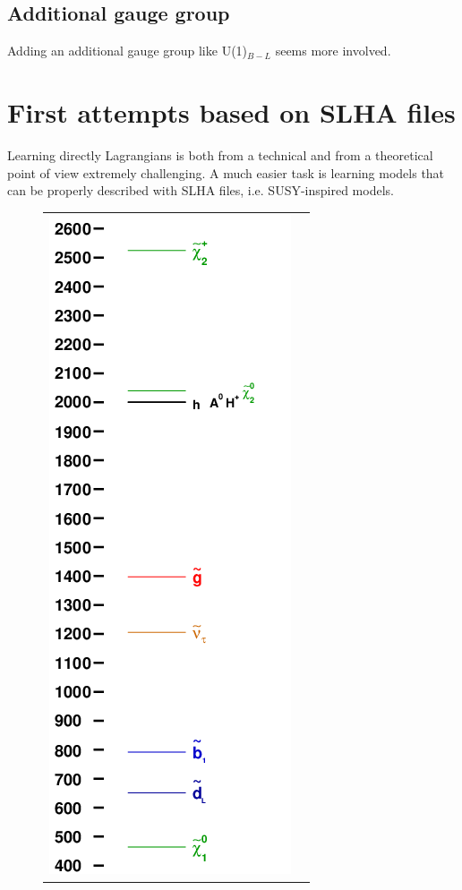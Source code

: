 \documentclass[11pt,singleside,a4paper,makeidx,notitlepage]{article}
\begin{document}
\subsection*{Additional gauge group}
\label{sec:gauge}
Adding an additional gauge group like U(1)$_{B-L}$ seems more involved.

\section{First attempts based on SLHA files}
\label{sec:slha}
Learning directly Lagrangians is both from a technical and from a theoretical
point of view extremely challenging. A much easier task is learning models
that can be properly described with SLHA files, i.e. SUSY-inspired models.

\begin{figure}[h!t]
\begin{center}
\begin{tabular}{cc}
\includegraphics[width=.49\textwidth]{ruler.png} &

\end{tabular}
\end{center}
\end{figure}
\end{document}
